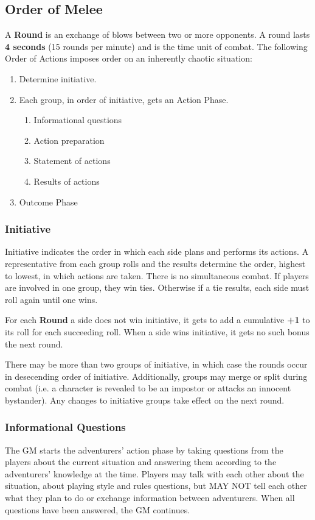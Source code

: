 \begin{multicols*}{2}
\subsection{Order of Melee}
A \textbf{Round} is an exchange of blows between two or more opponents. A round lasts \textbf{4 seconds} (15 rounds per minute) and is the time unit of combat. The following Order of Actions imposes order on an inherently chaotic situation:
\begin{enumerate}
\item Determine initiative.
\item Each group, in order of initiative, gets an Action Phase.
\begin{enumerate}
\item Informational questions
\item Action preparation
\item Statement of actions
\item Results of actions
\end{enumerate}
\item Outcome Phase
\end{enumerate}
\subsubsection{Initiative}
Initiative indicates the order in which each side plans and performs its actions. A representative from each group rolls  and the results determine the order, highest to lowest, in which actions are taken. There is no simultaneous combat. If players are involved in one group, they win ties. Otherwise if a tie results, each side must roll again until one wins.

For each \textbf{Round} a side does not win initiative, it gets to add a cumulative \textbf{+1} to its roll for each succeeding roll. When a side wins initiative, it gets no such bonus the next round.

There may be more than two groups of initiative, in which case the rounds occur in desecending order of initiative. Additionally, groups may merge or split during combat (i.e. a character is revealed to be an impostor or attacks an innocent bystander). Any changes to initiative groups take effect on the next round. 
\subsubsection{Informational Questions}
The GM starts the adventurers' action phase by taking questions from the players about the current situation and answering them according to the adventurers' knowledge at the time. Players may talk with each other about the situation, about playing style and rules questions, but MAY NOT tell each other what they plan to do or exchange information between adventurers. When all questions have been answered, the GM continues.

\end{multicols*}
